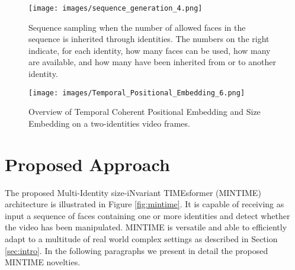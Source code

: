\documentclass[10pt,twocolumn,letterpaper]{article}
\begin{document}
\begin{figure}[t]
  \centering
   \texttt{[image: images/sequence\_generation\_4.png]}
   \caption{Sequence sampling when the number of allowed faces in the sequence is inherited through identities. The numbers on the right indicate, for each identity, how many faces can be used, how many are available, and how many have been inherited from or to another identity.}
    \label{figure:sequence_generation}
\end{figure}
\begin{figure*}[t]
    \centering
    \texttt{[image: images/Temporal\_Positional\_Embedding\_6.png]}
    \caption{Overview of Temporal Coherent Positional Embedding and Size Embedding on a two-identities video frames.}
    \label{fig:embeddings}
\end{figure*}


\section{Proposed Approach}
The proposed Multi-Identity size-iNvariant TIMEsformer (MINTIME) architecture is illustrated in Figure \ref{fig:mintime}. It is capable of receiving as input a sequence of  faces containing one or more identities and detect whether the video has been manipulated. MINTIME is versatile and able to efficiently adapt to a multitude of real world complex settings as described in Section \ref{sec:intro}.
In the following paragraphs we present in detail the proposed MINTIME novelties. 
\end{document}
